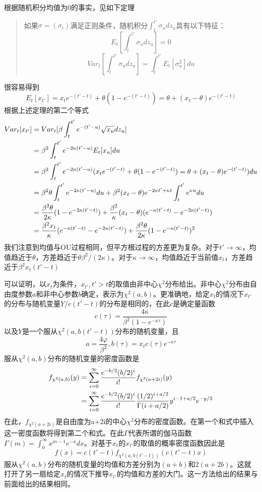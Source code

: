 \documentclass[UTF8]{ctexart}
\newcommand \qd[1] {\begin{qds} {#1} \end{qds}}
\begin{document}
根据随机积分均值为0的事实，见如下定理
\qd{
\begin{quote}
如果$\sigma=(\sigma_t)$满足正则条件，随机积分$\int_t^{t'}\sigma_u dz_u$具有以下特征：
$$E_t[\int_t^{t'}\sigma_u dz_u]=0$$
$$Var_t[\int_t^{t'}\sigma_u dz_u]=\int_t^{t'}E_t[\sigma_u^2]du$$
\end{quote}
}
很容易得到
$$E_t[x_{t'}]=x_t e^{-(t'-t)} + \theta(1-e^{-(t'-t)})=\theta+(x_t-\theta) e^{-(t'-t)}$$
根据上述定理的第二个等式
\begin{align}
Var_t[x_{t'}]
&=Var_t[\beta \int_t^{t'}e^{-(t'-u)} \sqrt{x_u}dz_u] \notag \\
&=\beta^2 \int_t^{t'} e^{-2 \kappa (t'-u)} E_t[x_u]du \notag \\
&=\beta^2 \int_t^{t'} e^{-2 \kappa (t'-u)} (x_t e^{-(t'-t)} + \theta(1-e^{-(t'-t)})=\theta+(x_t-\theta) e^{-(t'-t)}) du \notag \\
&=\beta^2 \theta \int_t^{t'} e^{-2 \kappa (t'-u)} du + \beta^2 (x_t-\theta) e^{-2 \kappa  t' + \kappa t} \int_t^{t'} e^{\kappa u}du \notag \\
&=\frac{\beta^2 \theta}{2 \kappa} (1-e^{-2 \kappa (t'-t)}) + \frac{\beta^2}{\kappa}(x_t-\theta)(e^{-\kappa(t'-t)}-e^{-2 \kappa(t'-t)}) \notag \\
&=\frac{\beta^2 x_t}{\kappa}(e^{-\kappa(t'-t)}-e^{-2 \kappa(t'-t)}) + \frac{\beta^2 \theta}{2 \kappa}(1-e^{-\kappa(t'-t)})^2 \notag 
\end{align}
我们注意到均值与OU过程相同，但平方根过程的方差更为复杂。对于$t' \rightarrow \infty$，均值趋近于$\theta$，方差趋近于$\theta \beta^2 /(2 \kappa)$。对于$\kappa \rightarrow \infty$，均值趋近于当前值$x_t$，方差趋近于$\beta^2 x_t (t'-t)$

可以证明，以$x_t$为条件，$x_{t'},t' > t$的取值由非中心$\chi^2$分布给出。非中心$\chi^2$分布由自由度参数$a$和非中心参数$b$确定，表示为$\chi^2(a,b)$。更准确地，给定$x_t$的情况下$x_{t'}$的分布与随机变量$Y/c(t'-t)$的分布是相同的，在此$c$是确定量函数
$$c(\tau)=\frac{4\kappa}{\beta^2(1-e^{-\kappa \tau})}$$
以及$Y$是一个服从$\chi^2(a,b(t'-t))$分布的随机变量，且
$$a=\frac{4 \varphi}{\beta^2},b(\tau)=x_t c(\tau) e^{-\kappa \tau}$$
服从$\chi^2(a,b)$分布的随机变量的密度函数是
\begin{align}
f_{\chi^2(a,b)}(y)
&= \sum\limits_{i=0}^\infty \frac{e^{-b/2} (b/2)^i}{i!} f_{\chi^2(a+2i)}(y)\notag \\
&= \sum\limits_{i=0}^\infty \frac{e^{-b/2} (b/2)^i}{i!} \frac{(1/2)^{i+a/2}}{\Gamma(i+a/2)} y^{i-1+a/2} e^{-y/2} \notag
\end{align}
在此，$f_{\chi^2 (a+2i)}$是自由度为a+2i的中心$\chi^2$分布的密度函数。在第一个和式中插入这一密度函数将得到第二个和式。在此$\Gamma$代表所谓的伽马函数$\Gamma(m)=\int_0^\infty x^{m-1}e^{-x}dx$。对基于$x_t$的$x_{t'}$的取值的概率密度函数因此是
$$f(x)=c(t'-t)f_{\chi^2(a,b(t'-t))}(c(t'-t)x)$$
服从$\chi^2(a,b)$分布的随机变量的均值和方差分别为$(a+b)$和$2(a+2b)$。这就打开了另一扇给定$x_t$的情况下推导$x_{t'}$的均值和方差的大门。这一方法给出的结果与前面给出的结果相同。
\end{document}
